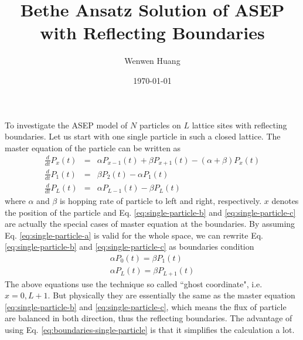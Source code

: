 \documentclass[12pt,a4paper]{article}
\begin{document}
\title{Bethe Ansatz Solution of ASEP with Reflecting Boundaries}
\author{Wenwen Huang}
\date{\today}
\maketitle

To investigate the ASEP model of $N$ particles on $L$ lattice sites with
reflecting boundaries. Let us start with one single particle in such a closed
lattice. The master equation of the particle can be written as
\begin{subequations}
\begin{eqnarray}
    \label{eq:single-particle-a}
    \frac{d}{dt} P_x(t) & = & \alpha P_{x-1}(t) + \beta P_{x+1}(t) - (\alpha +
    \beta)P_x(t) \\
    \label{eq:single-particle-b}
    \frac{d}{dt} P_1(t) & = & \beta P_2(t) - \alpha P_1(t) \\
    \label{eq:single-particle-c}
    \frac{d}{dt} P_L(t) & = & \alpha P_{L-1}(t) - \beta P_L(t)
\end{eqnarray}
\end{subequations}
where $\alpha$ and $\beta$ is hopping rate of particle to left and right,
respectively. $x$ denotes the position of the particle and Eq.
\eqref{eq:single-particle-b} and \eqref{eq:single-particle-c} are actually the
special cases of master equation at the boundaries.  By assuming Eq.
\eqref{eq:single-particle-a} is valid for the whole space, we can rewrite
Eq. \eqref{eq:single-particle-b} and \eqref{eq:single-particle-c} as boundaries
condition 
\begin{subequations}
    \label{eq:boundaries-single-particle}
\begin{eqnarray}
    \alpha P_0(t) = \beta P_1(t) \\
    \alpha P_L(t) = \beta P_{L+1}(t)
\end{eqnarray}
\end{subequations}
The above equations use the technique so called ``ghost coordinate", i.e.
$x=0,L+1$. But physically they are essentially the same as the master equation
\eqref{eq:single-particle-b} and \eqref{eq:single-particle-c}, which means the
flux of particle are balanced in both direction, thus the reflecting boundaries.
The advantage of using Eq. \eqref{eq:boundaries-single-particle} is that it
simplifies the calculation a lot.  
\end{document}

